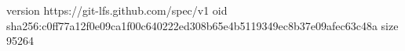 version https://git-lfs.github.com/spec/v1
oid sha256:c0ff77a12f0e09ca1f00c640222ed308b65e4b5119349ec8b37e09afec63c48a
size 95264
